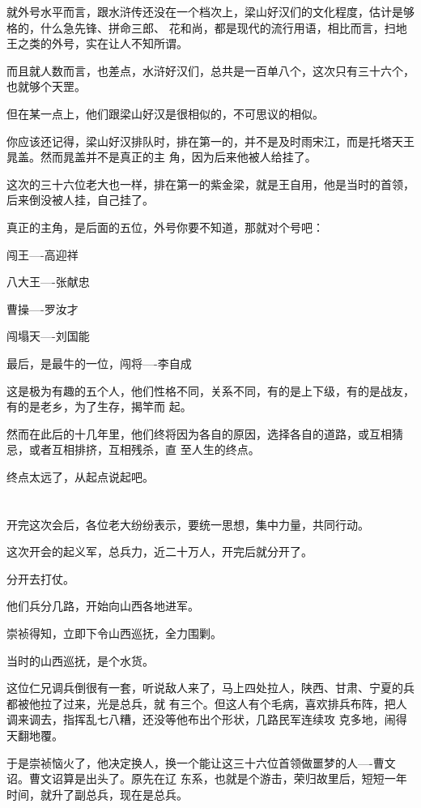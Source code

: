 \documentclass[11pt,a4paper,onecolumn]{article}
\begin{document}
就外号水平而言，跟水浒传还没在一个档次上，梁山好汉们的文化程度，估计是够格的，什么急先锋、拼命三郎、
花和尚，都是现代的流行用语，相比而言，扫地王之类的外号，实在让人不知所谓。

而且就人数而言，也差点，水浒好汉们，总共是一百单八个，这次只有三十六个，也就够个天罡。

但在某一点上，他们跟梁山好汉是很相似的，不可思议的相似。

你应该还记得，梁山好汉排队时，排在第一的，并不是及时雨宋江，而是托塔天王晁盖。然而晁盖并不是真正的主
角，因为后来他被人给挂了。

这次的三十六位老大也一样，排在第一的紫金梁，就是王自用，他是当时的首领，后来倒没被人挂，自己挂了。

真正的主角，是后面的五位，外号你要不知道，那就对个号吧：

闯王----高迎祥

八大王----张献忠

曹操----罗汝才

闯塌天----刘国能

最后，是最牛的一位，闯将----李自成

这是极为有趣的五个人，他们性格不同，关系不同，有的是上下级，有的是战友，有的是老乡，为了生存，揭竿而
起。

然而在此后的十几年里，他们终将因为各自的原因，选择各自的道路，或互相猜忌，或者互相排挤，互相残杀，直
至人生的终点。

终点太远了，从起点说起吧。

\section[\thesection]{}

开完这次会后，各位老大纷纷表示，要统一思想，集中力量，共同行动。

这次开会的起义军，总兵力，近二十万人，开完后就分开了。

分开去打仗。

他们兵分几路，开始向山西各地进军。

崇祯得知，立即下令山西巡抚，全力围剿。

当时的山西巡抚，是个水货。

这位仁兄调兵倒很有一套，听说敌人来了，马上四处拉人，陕西、甘肃、宁夏的兵都被他拉了过来，光是总兵，就
有三个。但这人有个毛病，喜欢排兵布阵，把人调来调去，指挥乱七八糟，还没等他布出个形状，几路民军连续攻
克多地，闹得天翻地覆。

于是崇祯恼火了，他决定换人，换一个能让这三十六位首领做噩梦的人----曹文诏。曹文诏算是出头了。原先在辽
东系，也就是个游击，荣归故里后，短短一年时间，就升了副总兵，现在是总兵。
\end{document}
